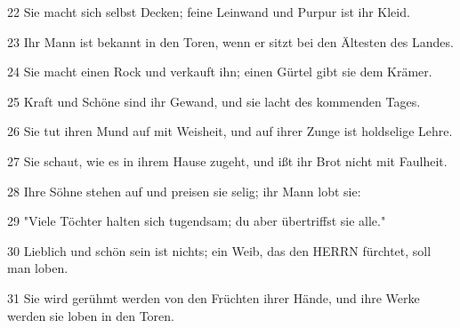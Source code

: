 \par 22 Sie macht sich selbst Decken; feine Leinwand und Purpur ist ihr Kleid.
\par 23 Ihr Mann ist bekannt in den Toren, wenn er sitzt bei den Ältesten des Landes.
\par 24 Sie macht einen Rock und verkauft ihn; einen Gürtel gibt sie dem Krämer.
\par 25 Kraft und Schöne sind ihr Gewand, und sie lacht des kommenden Tages.
\par 26 Sie tut ihren Mund auf mit Weisheit, und auf ihrer Zunge ist holdselige Lehre.
\par 27 Sie schaut, wie es in ihrem Hause zugeht, und ißt ihr Brot nicht mit Faulheit.
\par 28 Ihre Söhne stehen auf und preisen sie selig; ihr Mann lobt sie:
\par 29 "Viele Töchter halten sich tugendsam; du aber übertriffst sie alle."
\par 30 Lieblich und schön sein ist nichts; ein Weib, das den HERRN fürchtet, soll man loben.
\par 31 Sie wird gerühmt werden von den Früchten ihrer Hände, und ihre Werke werden sie loben in den Toren.


